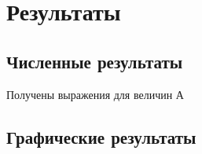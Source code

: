 \chapter{Результаты}\label{ch:results}

\section*{Численные результаты}
Получены выражения для величин А

\section*{Графические результаты}
